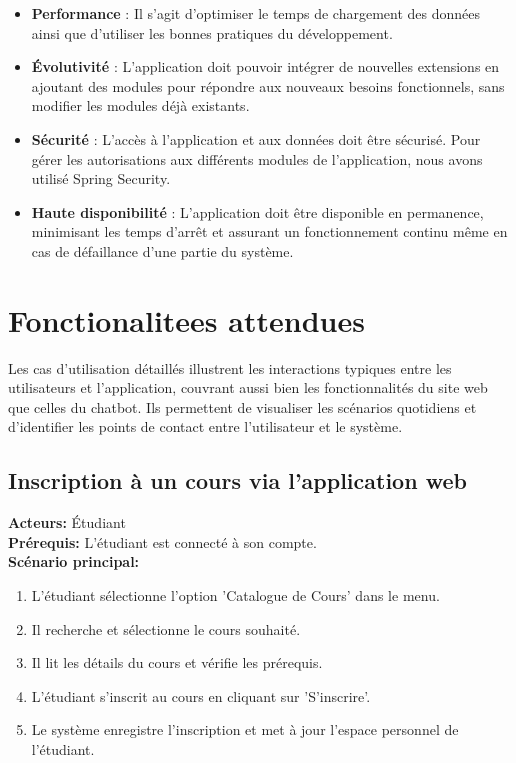 \documentclass[a4paper, 11pt, openany]{report}
\begin{document}
\begin{itemize}
    \item \textbf{Performance} : Il s'agit d'optimiser le temps de chargement des données ainsi que d'utiliser les bonnes pratiques du développement.
    \item \textbf{Évolutivité} : L'application doit pouvoir intégrer de nouvelles extensions en ajoutant des modules pour répondre aux nouveaux besoins fonctionnels, sans modifier les modules déjà existants.
    \item \textbf{Sécurité} : L'accès à l'application et aux données doit être sécurisé. Pour gérer les autorisations aux différents modules de l'application, nous avons utilisé Spring Security.
    \item \textbf{Haute disponibilité} : L'application doit être disponible en permanence, minimisant les temps d'arrêt et assurant un fonctionnement continu même en cas de défaillance d'une partie du système.
\end{itemize}


\section{Fonctionalitees attendues}

Les cas d'utilisation détaillés illustrent les interactions typiques entre les utilisateurs et l'application, couvrant aussi bien les fonctionnalités du site web que celles du chatbot. Ils permettent de visualiser les scénarios quotidiens et d'identifier les points de contact entre l'utilisateur et le système.

\subsection{Inscription à un cours via l'application web}
\textbf{Acteurs:} Étudiant \\
\textbf{Prérequis:} L'étudiant est connecté à son compte. \\
\textbf{Scénario principal:}
\begin{enumerate}
    \item L'étudiant sélectionne l'option 'Catalogue de Cours' dans le menu.
    \item Il recherche et sélectionne le cours souhaité.
    \item Il lit les détails du cours et vérifie les prérequis.
    \item L'étudiant s'inscrit au cours en cliquant sur 'S'inscrire'.
    \item Le système enregistre l'inscription et met à jour l'espace personnel de l'étudiant.
\end{enumerate}
\end{document}
